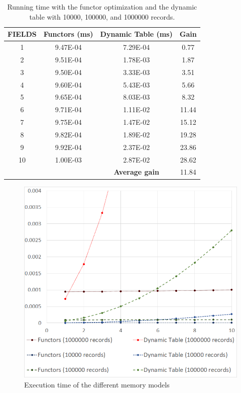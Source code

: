 \begin{table}
	\vspace{0.15cm}
	\begin{tabular}{|c|c|c|c|}
		\hline
		\textbf{FIELDS}& \textbf{Functors (ms)}&\textbf{Dynamic Table (ms)} & \textbf{Gain}\\ \hline
		1&	9.47E-04&	7.29E-04&	0.77\\ \hline
		2&	9.51E-04&	1.78E-03&	1.87\\ \hline
		3&	9.50E-04&	3.33E-03&	3.51\\ \hline
		4&	9.60E-04&	5.43E-03&	5.66\\ \hline
		5&	9.65E-04&	8.03E-03&	8.32\\ \hline
		6&	9.71E-04&	1.11E-02&	11.44\\ \hline
		7&	9.75E-04&	1.47E-02&	15.12\\ \hline
		8&	9.82E-04&	1.89E-02&	19.28\\ \hline
		9&	9.92E-04&	2.37E-02&	23.86\\ \hline
		10&	1.00E-03&	2.87E-02&	28.62\\ \hline
		\multicolumn{2}{c|}{} & \textbf{Average gain} & 11.84\\ \cline{3-4}						
	\end{tabular}
 	\caption{Running time with the functor optimization and the dynamic table with 10000, 100000, and 1000000 records.}
	\label{tab:ch_functors_results}
\end{table}

\begin{figure}
	\includegraphics[width = \textwidth]{Figures/chapter_functors/functor_chart}
	\caption{Execution time of the different memory models}
	\label{fig:ch_functors_chart}
\end{figure}

